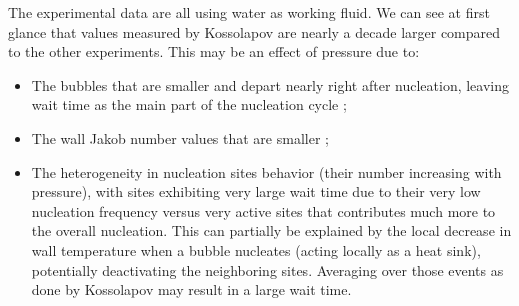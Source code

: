 \begin{table}[h!]


\noindent{}

\caption{Bubble wait time data in vertical flow boiling. Wall superheat values for Richenderfer data are estimated using Frost \& Dzakowic correlation (Eq. \ref{eq:frost}).}
\label{tab:tw_exp_data}


\end{table}

The experimental data are all using water as working fluid. We can see at first glance that values measured by Kossolapov are nearly a decade larger compared to the other experiments. This may be an effect of pressure due to:

\begin{itemize}
\item The bubbles that are smaller and depart nearly right after nucleation, leaving wait time as the main part of the nucleation cycle ;
\item The wall Jakob number values that are smaller ;
\item The heterogeneity in nucleation sites behavior (their number increasing with pressure), with sites exhibiting very large wait time due to their very low nucleation frequency versus very active sites that contributes much more to the overall nucleation. This can partially be explained by the local decrease in wall temperature when a bubble nucleates (acting locally as a heat sink), potentially deactivating the neighboring sites. Averaging over those events as done by Kossolapov \cite{kossolapov_experimental_2021} may result in a large wait time.
\end{itemize}


